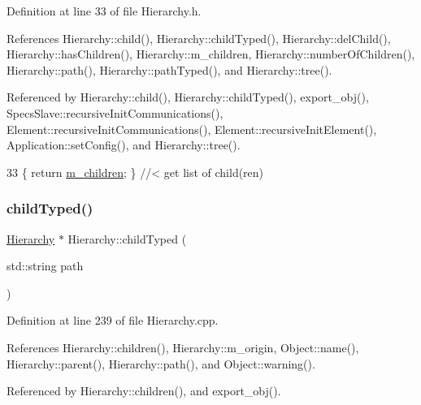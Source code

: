 Definition at line 33 of file Hierarchy.\+h.



References Hierarchy\+::child(), Hierarchy\+::child\+Typed(), Hierarchy\+::del\+Child(), Hierarchy\+::has\+Children(), Hierarchy\+::m\+\_\+children, Hierarchy\+::number\+Of\+Children(), Hierarchy\+::path(), Hierarchy\+::path\+Typed(), and Hierarchy\+::tree().



Referenced by Hierarchy\+::child(), Hierarchy\+::child\+Typed(), export\+\_\+obj(), Specs\+Slave\+::recursive\+Init\+Communications(), Element\+::recursive\+Init\+Communications(), Element\+::recursive\+Init\+Element(), Application\+::set\+Config(), and Hierarchy\+::tree().


\begin{DoxyCode}
33 \{ \textcolor{keywordflow}{return} \hyperlink{classHierarchy_a038816763941fd4a930504917f60483b}{m\_children};  \} \textcolor{comment}{//< get list of child(ren)}
\end{DoxyCode}
\mbox{\label{classHierarchy_a0c15a5276a3b80b4354d6bd8a01e0708}} 
\subsubsection{\texorpdfstring{child\+Typed()}{childTyped()}}
{\footnotesize\ttfamily \hyperlink{classHierarchy}{Hierarchy} $\ast$ Hierarchy\+::child\+Typed (\begin{DoxyParamCaption}\item[{std\+::string}]{path }\end{DoxyParamCaption})\hspace{0.3cm}{\ttfamily [inherited]}}



Definition at line 239 of file Hierarchy.\+cpp.



References Hierarchy\+::children(), Hierarchy\+::m\+\_\+origin, Object\+::name(), Hierarchy\+::parent(), Hierarchy\+::path(), and Object\+::warning().



Referenced by Hierarchy\+::children(), and export\+\_\+obj().


